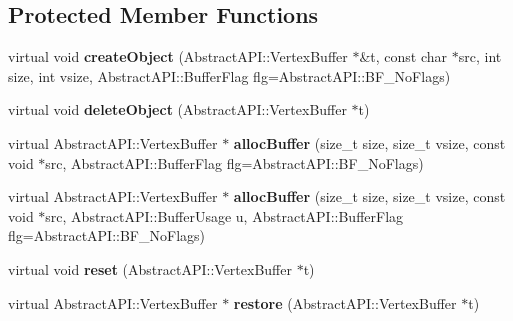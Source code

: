 \subsection*{Protected Member Functions}
\begin{DoxyCompactItemize}
\item 
\hypertarget{class_tempest_1_1_vertex_buffer_holder_a7fe603b6626007da9ec3c6bcf0afcd18}{virtual void {\bfseries create\+Object} (Abstract\+A\+P\+I\+::\+Vertex\+Buffer $\ast$\&t, const char $\ast$src, int size, int vsize, Abstract\+A\+P\+I\+::\+Buffer\+Flag flg=Abstract\+A\+P\+I\+::\+B\+F\+\_\+\+No\+Flags)}\label{class_tempest_1_1_vertex_buffer_holder_a7fe603b6626007da9ec3c6bcf0afcd18}

\item 
\hypertarget{class_tempest_1_1_vertex_buffer_holder_a0fab8954422c56d390bccc88b8901bfc}{virtual void {\bfseries delete\+Object} (Abstract\+A\+P\+I\+::\+Vertex\+Buffer $\ast$t)}\label{class_tempest_1_1_vertex_buffer_holder_a0fab8954422c56d390bccc88b8901bfc}

\item 
\hypertarget{class_tempest_1_1_vertex_buffer_holder_a394c7c2c1ddc914a0b024217385c19d9}{virtual Abstract\+A\+P\+I\+::\+Vertex\+Buffer $\ast$ {\bfseries alloc\+Buffer} (size\+\_\+t size, size\+\_\+t vsize, const void $\ast$src, Abstract\+A\+P\+I\+::\+Buffer\+Flag flg=Abstract\+A\+P\+I\+::\+B\+F\+\_\+\+No\+Flags)}\label{class_tempest_1_1_vertex_buffer_holder_a394c7c2c1ddc914a0b024217385c19d9}

\item 
\hypertarget{class_tempest_1_1_vertex_buffer_holder_adaa741af6e5d37f4da841fef3049630e}{virtual Abstract\+A\+P\+I\+::\+Vertex\+Buffer $\ast$ {\bfseries alloc\+Buffer} (size\+\_\+t size, size\+\_\+t vsize, const void $\ast$src, Abstract\+A\+P\+I\+::\+Buffer\+Usage u, Abstract\+A\+P\+I\+::\+Buffer\+Flag flg=Abstract\+A\+P\+I\+::\+B\+F\+\_\+\+No\+Flags)}\label{class_tempest_1_1_vertex_buffer_holder_adaa741af6e5d37f4da841fef3049630e}

\item 
\hypertarget{class_tempest_1_1_vertex_buffer_holder_aad163239e27199d5a38659bb7fb28a9e}{virtual void {\bfseries reset} (Abstract\+A\+P\+I\+::\+Vertex\+Buffer $\ast$t)}\label{class_tempest_1_1_vertex_buffer_holder_aad163239e27199d5a38659bb7fb28a9e}

\item 
\hypertarget{class_tempest_1_1_vertex_buffer_holder_a6f1653bb77069d069bcc8989e7a1463b}{virtual Abstract\+A\+P\+I\+::\+Vertex\+Buffer $\ast$ {\bfseries restore} (Abstract\+A\+P\+I\+::\+Vertex\+Buffer $\ast$t)}\label{class_tempest_1_1_vertex_buffer_holder_a6f1653bb77069d069bcc8989e7a1463b}


\end{DoxyCompactItemize}
